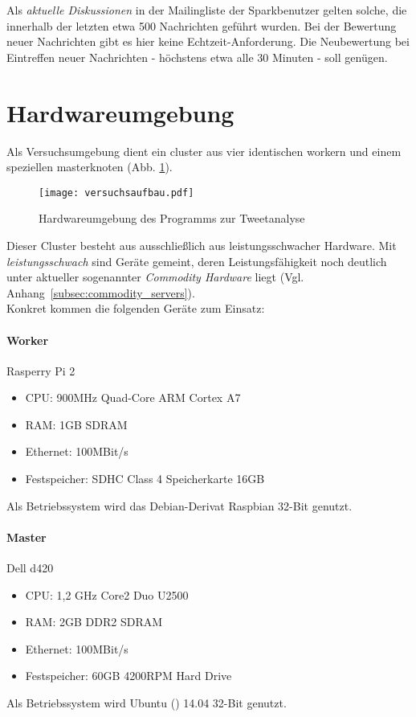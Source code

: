 Als \textit{aktuelle Diskussionen} in der Mailingliste der Sparkbenutzer gelten solche, die innerhalb der letzten etwa 500 Nachrichten geführt wurden. Bei der Bewertung neuer Nachrichten gibt es hier keine Echtzeit-Anforderung. Die Neubewertung bei Eintreffen neuer Nachrichten - höchstens etwa alle 30 Minuten - soll genügen.\\

\section{Hardwareumgebung}

Als Versuchsumgebung dient ein \gls{cluster} aus vier identischen \gls{worker}n und einem speziellen \gls{master}knoten (Abb. \ref{figure:versuchsaufbau}).

\begin{figure}[h]
	\centering
  \texttt{[image: versuchsaufbau.pdf]}
	\caption{Hardwareumgebung des Programms zur Tweetanalyse}
	\label{figure:versuchsaufbau}
\end{figure}

Dieser Cluster besteht aus ausschließlich aus leistungsschwacher Hardware. Mit \textit{leistungsschwach} sind Geräte gemeint, deren Leistungsfähigkeit noch deutlich unter aktueller sogenannter \textit{Commodity Hardware} liegt (Vgl. Anhang~\ref{subsec:commodity_servers}).\\

Konkret kommen die folgenden Geräte zum Einsatz:

\paragraph{Worker}
Rasperry Pi 2
\begin{itemize}
	\item CPU: 900MHz Quad-Core ARM Cortex A7
	\item RAM: 1GB SDRAM
	\item Ethernet: 100MBit/s
	\item Festspeicher: SDHC Class 4 Speicherkarte 16GB
\end{itemize}
Als Betriebssystem wird das Debian-Derivat Raspbian\cite{raspbian} 32-Bit genutzt.

\paragraph{Master}
Dell d420
\begin{itemize}
	\item CPU: 1,2 GHz Core2 Duo U2500
	\item RAM: 2GB DDR2 SDRAM
	\item Ethernet: 100MBit/s
	\item Festspeicher: 60GB 4200RPM Hard Drive
\end{itemize}
Als Betriebssystem wird Ubuntu (\cite{ubuntu}) 14.04 32-Bit genutzt.\\

